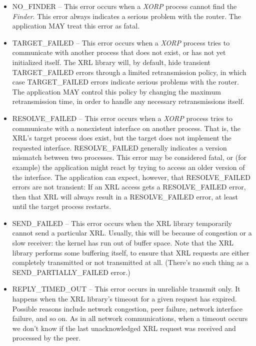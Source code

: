 \documentclass[11pt]{article}
\makeatletter
\newcommand{\xorp} {{\em XORP}\@\xspace}
\newcommand{\finder} {{\em Finder}\@\xspace}
\makeatother
\begin{document}
\begin{itemize}

\item NO\_FINDER -- This error occurs when a \xorp process cannot find the
\finder. This error always indicates a serious problem with the router. The
application MAY treat this error as fatal.

\item TARGET\_FAILED -- This error occurs when a \xorp process tries to
communicate with another process that does not exist, or has not yet
initialized itself. The XRL library will, by default, hide transient
TARGET\_FAILED errors through a limited retransmission policy, in which
case TARGET\_FAILED errors indicate serious problems with the router. The
application MAY control this policy by changing the maximum retransmission
time, in order to handle any necessary retransmissions itself.

\item RESOLVE\_FAILED -- This error occurs when a \xorp process tries to
communicate with a nonexistent interface on another process. That is, the
XRL's target process does exist, but the target does not implement the
requested interface. RESOLVE\_FAILED generally indicates a version mismatch
between two processes. This error may be considered fatal, or (for example)
the application might react by trying to access an older version of the
interface. The application can expect, however, that RESOLVE\_FAILED errors
are not transient: If an XRL access gets a RESOLVE\_FAILED error, then that
XRL will always result in a RESOLVE\_FAILED error, at least until the
target process restarts.

\item SEND\_FAILED -- This error occurs when the XRL library temporarily
cannot send a particular XRL. Usually, this will be because of congestion
or a slow receiver: the kernel has run out of buffer space. Note that the
XRL library performs some buffering itself, to ensure that XRL requests are
either completely transmitted or not transmitted at all. (There's no such
thing as a SEND\_PARTIALLY\_FAILED error.)

\item REPLY\_TIMED\_OUT -- This error occurs in unreliable transmit only.
It happens when the XRL library's timeout for a given request has expired.
Possible reasons include network congestion, peer failure, network
interface failure, and so on. As in all network communications, when a
timeout occurs we don't know if the last unacknowledged XRL request was
received and processed by the peer.


\end{itemize}
\end{document}
